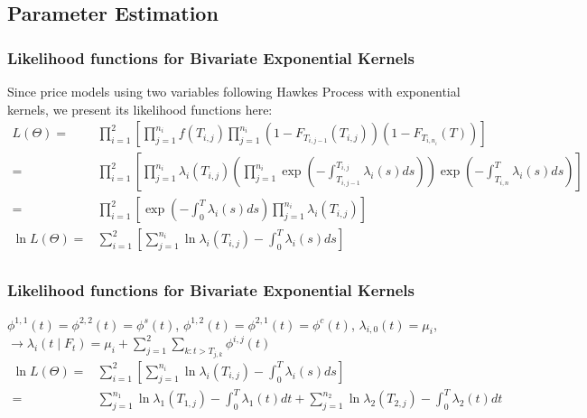\documentclass{beamer}
\begin{document}
\subsection{Parameter Estimation}
\begin{frame}
\frametitle{Likelihood functions for Bivariate Exponential Kernels}
Since price models using two variables following Hawkes Process with exponential kernels, we present its likelihood functions here:
\begin{equation*}
\begin{split}
L(\Theta) = &\prod_{i=1}^2 \left[ \prod_{j=1}^{n_i} f(T_{i,j}) \prod_{j=1}^{n_i} (1-F_{T_{i,j-1}}(T_{i,j})) (1-F_{T_{i,n_i}}(T)) \right]\\
= &\prod_{i=1}^2 \left[ \prod_{j=1}^{n_i} \lambda_i(T_{i,j}) \left(\prod_{j=1}^{n_i} \exp(-\int_{T_{i,j-1}}^{T_{i,j}} \lambda_i(s) ds)\right) \exp \left(-\int_{T_{i,n}}^{T} \lambda_i(s) ds\right) \right]\\
= &\prod_{i=1}^2 \left[ \exp \left(-\int_{0}^{T} \lambda_i(s) ds\right) \prod_{j=1}^{n_i} \lambda_i(T_{i,j}) \right]\\
\ln L(\Theta) = & \sum_{i=1}^2 \left[ \sum_{j=1}^{n_i} \ln \lambda_i(T_{i,j})  -\int_{0}^{T} \lambda_i(s) ds \right]\\
\end{split}
\end{equation*}
\end{frame}

\begin{frame}
\frametitle{Likelihood functions for Bivariate Exponential Kernels}
$\phi^{1,1}(t) = \phi^{2,2}(t) = \phi^s(t)$, $\phi^{1,2}(t) = \phi^{2,1}(t) = \phi^c(t)$, $\lambda_{i,0}(t) = \mu_i $, $\to \lambda_i(t \mid F_{t}) = \mu_i + \sum_{j=1}^2 \sum_{k: t>T_{j,k}} \phi^{i,j}(t)$
\begin{equation*}
\begin{split}
\ln L(\Theta) = & \sum_{i=1}^2 \left[ \sum_{j=1}^{n_i} \ln \lambda_i(T_{i,j})  -\int_{0}^{T} \lambda_i(s) ds \right]\\
= & \sum_{j=1}^{n_1} \ln \lambda_1(T_{1,j})  -\int_{0}^{T} \lambda_1(t) dt +\sum_{j=1}^{n_2} \ln \lambda_2(T_{2,j})  -\int_{0}^{T} \lambda_2(t) dt\\
\end{split}
\end{equation*}
\end{frame}
\end{document}
